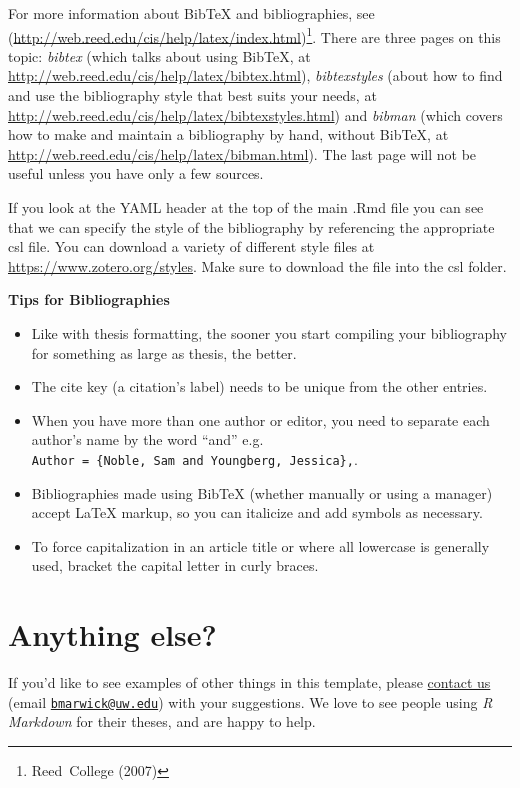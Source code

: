 \documentclass [11pt, proquest] {uwthesis}[2015/03/03]
\providecommand{\tightlist}{%
  \setlength{\itemsep}{0pt}\setlength{\parskip}{0pt}}
\begin{document}
For more information about BibTeX and bibliographies, see
(\url{http://web.reed.edu/cis/help/latex/index.html})\footnote{Reed~College
  (2007)}. There are three pages on this topic: \emph{bibtex} (which
talks about using BibTeX, at
\url{http://web.reed.edu/cis/help/latex/bibtex.html}),
\emph{bibtexstyles} (about how to find and use the bibliography style
that best suits your needs, at
\url{http://web.reed.edu/cis/help/latex/bibtexstyles.html}) and
\emph{bibman} (which covers how to make and maintain a bibliography by
hand, without BibTeX, at
\url{http://web.reed.edu/cis/help/latex/bibman.html}). The last page
will not be useful unless you have only a few sources.

If you look at the YAML header at the top of the main .Rmd file you can
see that we can specify the style of the bibliography by referencing the
appropriate csl file. You can download a variety of different style
files at \url{https://www.zotero.org/styles}. Make sure to download the
file into the csl folder.

\textbf{Tips for Bibliographies}
\begin{itemize}
\tightlist
\item
  Like with thesis formatting, the sooner you start compiling your
  bibliography for something as large as thesis, the better.
\item
  The cite key (a citation's label) needs to be unique from the other
  entries.
\item
  When you have more than one author or editor, you need to separate
  each author's name by the word ``and'' e.g.
  \texttt{Author\ =\ \{Noble,\ Sam\ and\ Youngberg,\ Jessica\},}.
\item
  Bibliographies made using BibTeX (whether manually or using a manager)
  accept LaTeX markup, so you can italicize and add symbols as
  necessary.
\item
  To force capitalization in an article title or where all lowercase is
  generally used, bracket the capital letter in curly braces.
\end{itemize}
\section{Anything else?}\label{anything-else}

If you'd like to see examples of other things in this template, please
\href{https://github.com/benmarwick/huskydown/issues/new}{contact us}
(email \href{mailto:bmarwick@uw.edu}{\nolinkurl{bmarwick@uw.edu}}) with
your suggestions. We love to see people using \emph{R Markdown} for
their theses, and are happy to help.
\end{document}
